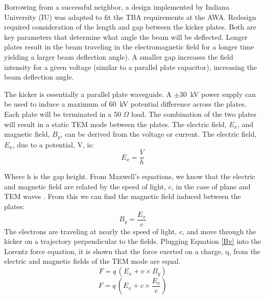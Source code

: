Borrowing from a successful neighbor, a design implemented by Indiana University (IU) \cite{iukicker}
was adapted to fit the TBA requirements at the AWA. Redesign required consideration
of the length and gap between the kicker plates. Both are key parameters that determine 
what angle the beam will be deflected. Longer plates result in the beam traveling 
in the electromagnetic field for a longer time yielding a larger beam deflection angle). 
A smaller gap increases the field intensity for a given voltage (similar to a parallel plate 
capacitor), increasing the beam deflection angle. 


The kicker is essentially a parallel plate waveguide. 
A $\pm$\SI{30}{kV} power supply can be used to induce a maximum of \SI{60}{kV} potential difference 
across the plates. Each plate will be terminated in a 50 $\Omega$ load.  
The combination of the two plates will result in a static TEM mode 
between the plates. The electric field, $E_x$, and magnetic field, $B_y$,
can be derived from the voltage or current. The electric field, $E_x$, due to a potential, V, is: 
\begin{equation}
E_x=\frac{V}{h}
\end{equation}

Where h is the gap height. From Maxwell's equations, we know that the electric and magnetic 
field are related by the speed of light, c, in the case of plane and TEM waves \cite{pozar}. 
From this we can find the magnetic field induced between the plates: 
\begin{equation}
B_y=\frac{E_x}{c}
\end{equation}\label{Bv}
The electrons are traveling at nearly the speed of light, $c$, and move through the kicker on a 
trajectory perpendicular to the fields.  Plugging Equation \ref{Bv} into the Lorentz force equation, 
it is shown that the force exerted on a charge, q, 
from the electric and magnetic fields of the TEM mode are equal. 
\begin{equation}
F=q\,(E_x+v\times B_y)
\end{equation}
\begin{equation}
	F = q \,\left(E_x+c\times \frac{E_x}{c}\right)
\end{equation}

